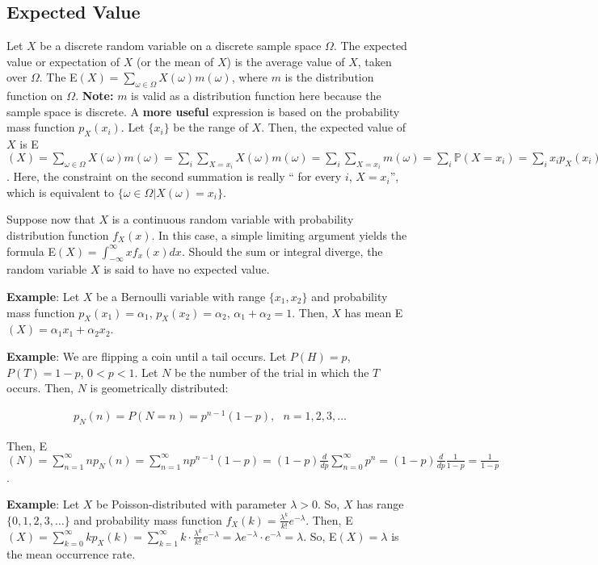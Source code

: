 \documentclass[12pt]{article}
\newcommand{\prob}[1]{\mathbb{P}(#1)}
\newcommand{\nspace}{\vspace*{.5cm}}
\newcommand{\nline}{\nspace \noindent}
\begin{document}
\subsection*{Expected Value}
Let $X$ be a discrete random variable on a discrete sample space $\Omega$. The expected value or expectation of $X$ (or the mean of $X$) is the average value of $X$, taken over $\Omega$. The E$(X) = \sum_{\omega \in \Omega} X(\omega) m(\omega)$, where $m$ is the distribution function on $\Omega$. \textbf{Note:} $m$ is valid as a distribution function here because the sample space is discrete. A \textbf{more useful} expression is based on the probability mass function $p_X(x_i)$. Let $\{ x_i \}$ be the range of $X$. Then, the expected value of $X$ is E$(X) = \sum_{\omega \in \Omega} X(\omega) m(\omega) = \sum_{i} \sum_{X = x_i} X(\omega) m(\omega) = \sum_{i} \sum_{X = x_i} m(\omega) = \sum_{i} \prob{X = x_i} = \sum_{i} x_i p_X (x_i)$. Here, the constraint on the second summation is really `` for every $i$, $X = x_i$'', which is equivalent to $\{ \omega \in \Omega \lvert X(\omega) = x_i \}$. 

\nline
Suppose now that $X$ is a continuous random variable with probability distribution function $f_X (x)$. In this case, a simple limiting argument yields the formula E$(X) = \int_{- \infty}^{\infty} x f_x (x) dx$. Should the sum or integral diverge, the random variable $X$ is said to have no expected value.

\nline
\textbf{Example}: Let $X$ be a Bernoulli variable with range $\{ x_1, x_2 \}$ and probability mass function $p_X (x_1) = \alpha_1$, $p_X (x_2) = \alpha_2$, $\alpha_1 + \alpha_2 = 1$. Then, $X$ has mean E$(X) = \alpha_1 x_1 + \alpha_2 x_2$.

\nline
\textbf{Example}: We are flipping a coin until a tail occurs. Let $P(H)=p$, $P(T)=1-p$, $0 < p < 1$. Let $N$ be the number of the trial in which the $T$ occurs. Then, $N$ is geometrically distributed:

\begin{align*}
p_N(n) = P(N=n) = p^{n-1} (1-p), \textbf{ } n=1,2,3, \ldots
\end{align*}

\noindent
Then, E$(N) = \sum_{n=1}^{\infty} n p_N(n) = \sum_{n=1}^{\infty} n p^{n-1} (1-p) = (1-p) \frac{d}{dp} \sum_{n=0}^{\infty} p^n = (1-p) \frac{d}{dp} \frac{1}{1-p} = \frac{1}{1-p}$.

\noindent
\textbf{Example}: Let $X$ be Poisson-distributed with parameter $\lambda > 0$. So, $X$ has range $\{ 0, 1, 2, 3, \ldots \}$ and probability mass function $f_X(k) = \frac{\lambda^k}{k!	} e^{- \lambda}$. Then, E$(X) = \sum_{k=0}^{\infty} k p_X(k) = \sum_{k=1}^{\infty} k \cdot \frac{\lambda^k}{k!	} e^{- \lambda} = \lambda e^{- \lambda} \cdot e^{- \lambda} = \lambda$. So, E$(X) = \lambda$ is the mean occurrence rate.
\end{document}
